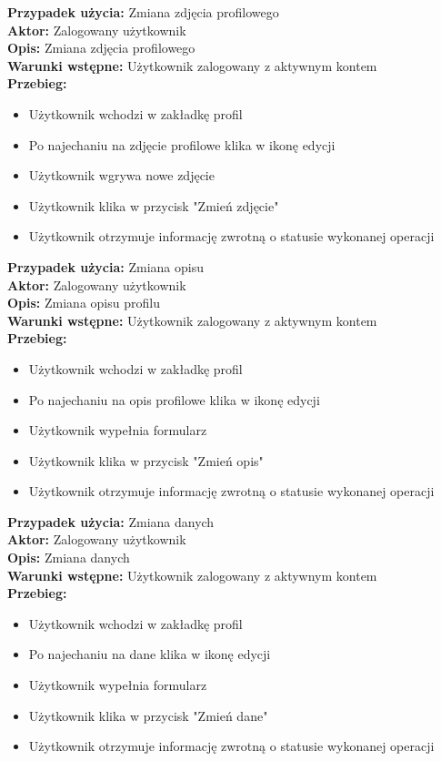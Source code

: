 \textbf{Przypadek użycia:} Zmiana zdjęcia profilowego\\
\textbf{Aktor:} Zalogowany użytkownik\\
\textbf{Opis:} Zmiana zdjęcia profilowego\\
\textbf{Warunki wstępne:} Użytkownik zalogowany z aktywnym kontem\\
\textbf{Przebieg:}
\begin{itemize}
    \item Użytkownik wchodzi w zakładkę profil
    \item Po najechaniu na zdjęcie profilowe klika w ikonę edycji
    \item Użytkownik wgrywa nowe zdjęcie
    \item Użytkownik klika w przycisk "Zmień zdjęcie"
    \item Użytkownik otrzymuje informację zwrotną o statusie wykonanej operacji
\end{itemize}

\textbf{Przypadek użycia:} Zmiana opisu\\
\textbf{Aktor:} Zalogowany użytkownik\\
\textbf{Opis:} Zmiana opisu profilu\\
\textbf{Warunki wstępne:} Użytkownik zalogowany z aktywnym kontem\\
\textbf{Przebieg:}
\begin{itemize}
    \item Użytkownik wchodzi w zakładkę profil
    \item Po najechaniu na opis profilowe klika w ikonę edycji
    \item Użytkownik wypełnia formularz
    \item Użytkownik klika w przycisk "Zmień opis"
    \item Użytkownik otrzymuje informację zwrotną o statusie wykonanej operacji
\end{itemize}

\textbf{Przypadek użycia:} Zmiana danych\\
\textbf{Aktor:} Zalogowany użytkownik\\
\textbf{Opis:} Zmiana danych\\
\textbf{Warunki wstępne:} Użytkownik zalogowany z aktywnym kontem\\
\textbf{Przebieg:}
\begin{itemize}
    \item Użytkownik wchodzi w zakładkę profil
    \item Po najechaniu na dane klika w ikonę edycji
    \item Użytkownik wypełnia formularz
    \item Użytkownik klika w przycisk "Zmień dane"
    \item Użytkownik otrzymuje informację zwrotną o statusie wykonanej operacji
\end{itemize}


